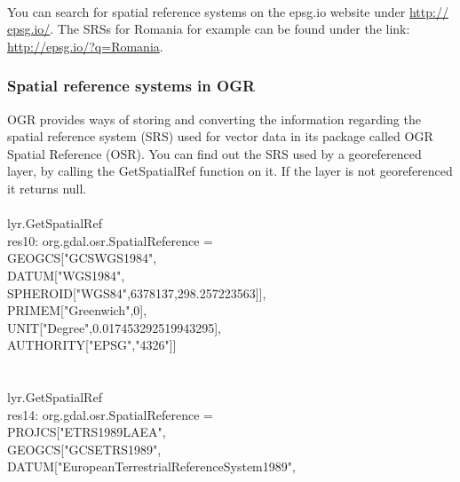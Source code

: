 \documentclass {article}
\begin{document}
\\
You can search for spatial reference systems on the epsg.io website under \href{http://epsg.io/}{http://\\epsg.io/}. The SRSs for Romania for example can be found under the link: \href{http://epsg.io/?q=Romania}{http://epsg.io/?q=Romania}.

\subsubsection{Spatial reference systems in OGR}

OGR provides ways of storing and converting the information regarding the spatial reference system (SRS) used for vector data in its package called OGR Spatial Reference (OSR).   
You can find out the SRS used by a georeferenced layer, by calling the GetSpatialRef function on it. If the layer is not georeferenced it returns null.  
\\
\\
lyr.GetSpatialRef \\
res10: org.gdal.osr.SpatialReference = \\
GEOGCS["GCS\underline{\space}WGS\underline{\space}1984",\\
\hspace*{2mm}DATUM["WGS\underline{\space}1984",\\
\hspace*{4mm}SPHEROID["WGS\underline{\space}84",6378137,298.257223563]],\\
\hspace*{2mm}PRIMEM["Greenwich",0],\\
\hspace*{2mm}UNIT["Degree",0.017453292519943295],\\
\hspace*{2mm}AUTHORITY["EPSG","4326"]] \\
\\
\\
lyr.GetSpatialRef \\
res14: org.gdal.osr.SpatialReference = \\
PROJCS["ETRS\underline{\space}1989\underline{\space}LAEA", \\
\hspace*{2mm} GEOGCS["GCS\underline{\space}ETRS\underline{\space}1989",\\
\hspace*{4mm} DATUM["European\underline{\space}Terrestrial\underline{\space}Reference\underline{\space}System\underline{\space}1989",\\
\end{document}

